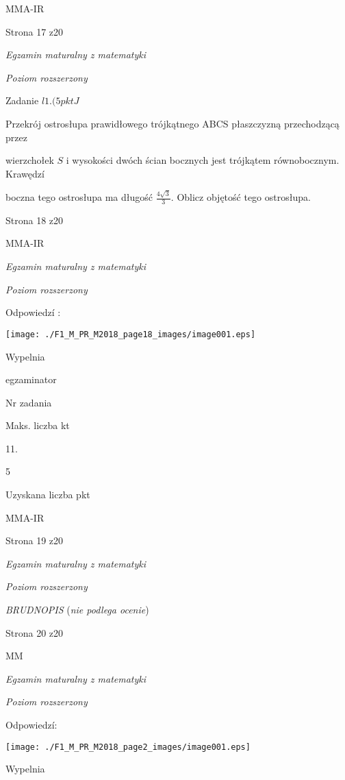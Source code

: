 \documentclass[a4paper,12pt]{article}
\begin{document}
MMA-IR

Strona 17 z20





{\it Egzamin maturalny z matematyki}

{\it Poziom rozszerzony}

Zadanie $l1. (5pktJ$

Przekrój ostrosłupa prawidłowego trójkątnego ABCS płaszczyzną przechodzącą przez

wierzchołek $S$ i wysokości dwóch ścian bocznych jest trójkątem równobocznym. Krawędzí

boczna tego ostrosłupa ma długość $\displaystyle \frac{4\sqrt{3}}{3}$. Oblicz objętość tego ostrosłupa.

Strona 18 z20

MMA-IR





{\it Egzamin maturalny z matematyki}

{\it Poziom rozszerzony}

Odpowiedzí :
\begin{center}
\texttt{[image: ./F1\_M\_PR\_M2018\_page18\_images/image001.eps]}
\end{center}
Wypelnia

egzaminator

Nr zadania

Maks. liczba kt

11.

5

Uzyskana liczba pkt

MMA-IR

Strona 19 z20





{\it Egzamin maturalny z matematyki}

{\it Poziom rozszerzony}

{\it BRUDNOPIS} ({\it nie podlega ocenie})

Strona 20 z20

MM





{\it Egzamin maturalny z matematyki}

{\it Poziom rozszerzony}

Odpowiedzí:
\begin{center}
\texttt{[image: ./F1\_M\_PR\_M2018\_page2\_images/image001.eps]}
\end{center}
Wypelnia
\end{document}
